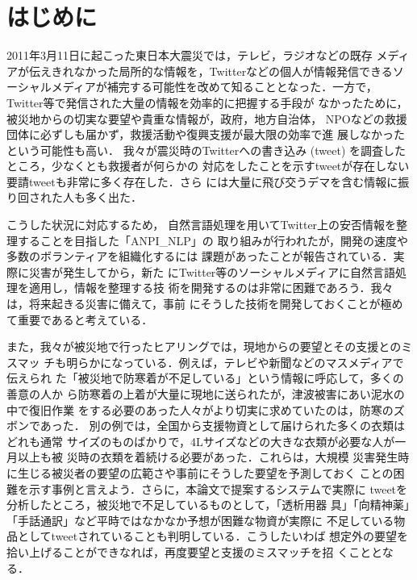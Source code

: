 \documentclass[japanese]{jnlp_1.4}
\begin{document}
\maketitle


\section{はじめに}
\label{Introduction}

2011年3月11日に起こった東日本大震災では，テレビ，ラジオなどの既存
メディアが伝えきれなかった局所的な情報を，Twitterなどの個人が情報発信できるソーシャルメディアが補完する可能性を改めて知ることとなった．一方で，
Twitter等で発信された大量の情報を効率的に把握する手段が
なかったために，被災地からの切実な要望や貴重な情報が，政府，地方自治体，
NPOなどの救援団体に必ずしも届かず，救援活動や復興支援が最大限の効率で進
展しなかったという可能性も高い．
我々が震災時のTwitterへの書き込み (tweet) を調査したところ，少なくとも救援者が何らかの
対応をしたことを示すtweetが存在しない要請tweetも非常に多く存在した．さら
には大量に飛び交うデマを含む情報に振り回された人も多く出た．

こうした状況に対応するため，
自然言語処理を用いてTwitter上の安否情報を整理することを目指した「ANPI\_NLP」の
取り組みが行われたが，開発の速度や多数のボランティアを組織化するには
課題があったことが報告されている\cite{Neubig2011}．実際に災害が発生してから，新た
にTwitter等のソーシャルメディアに自然言語処理を適用し，情報を整理する技
術を開発するのは非常に困難であろう．我々は，将来起きる災害に備えて，事前
にそうした技術を開発しておくことが極めて重要であると考えている．

また，我々が被災地で行ったヒアリングでは，現地からの要望とその支援とのミスマッ
チも明らかになっている．例えば，テレビや新聞などのマスメディアで伝えられ
た「被災地で防寒着が不足している」という情報に呼応して，多くの善意の人か
ら防寒着の上着が大量に現地に送られたが，津波被害にあい泥水の中で復旧作業
をする必要のあった人々がより切実に求めていたのは，防寒のズボンであった．
別の例では，全国から支援物資として届けられた多くの衣類はどれも通常
サイズのものばかりで，4Lサイズなどの大きな衣類が必要な人が一月以上も被
災時の衣類を着続ける必要があった．これらは，大規模
災害発生時に生じる被災者の要望の広範さや事前にそうした要望を予測しておく
ことの困難を示す事例と言えよう．さらに，本論文で提案するシステムで実際に
tweetを分析したところ，被災地で不足しているものとして，「透析用器
具」「向精神薬」「手話通訳」など平時ではなかなか予想が困難な物資が実際に
不足している物品としてtweetされていることも判明している．こうしたいわば
想定外の要望を拾い上げることができなれば，再度要望と支援のミスマッチを招
くこととなる．
\end{document}
